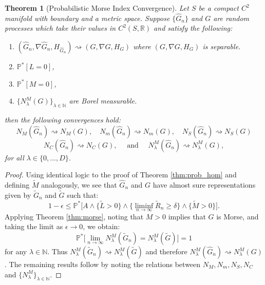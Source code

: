 \documentclass[11pt]{article}
\newcommand{\subscript}[2]{$#1 _ #2$}
\newcommand{\1}{\mathbf{1}}
\newtheorem{thm}{Theorem}%
\theoremstyle{definition}
\theoremstyle{remark}
\begin{document}
\begin{mdframed}
\begin{thm}[Probabilistic Morse Index Convergence]\label{thm:prob_morse}
     Let $S$ be a compact $C^2$ manifold with boundary and a metric space. Suppose $\{\hat{G}_n\}$ and $G$ are random processes which take their values in $C^2(S,\mathbb{R})$ and satisfy the following:
    \begin{enumerate}[label=(\subscript{M}{{\arabic*}})]
        \item $(\hat{G}_n, \nabla \hat{G}_n, H_{\hat{G}_n})\rightsquigarrow (G, \nabla G, H_{G})$ where $(G, \nabla G, H_{G})$ is separable.
        \item $\mathbb{P}^*[L=0]$,
        \item $\mathbb{P}^*[M=0]$,
        \item $\{N_\lambda^M(G)\}_{\lambda \in \mathbb{N}}$ are Borel measurable.
    \end{enumerate}
    then the following convergences hold:
    \begin{equation}\label{eq:conv_res_morse}
        N_M(\hat{G}_n)\rightsquigarrow N_M(G), \quad N_m(\hat{G}_n)\rightsquigarrow N_m(G), \quad N_S(\hat{G}_n)\rightsquigarrow N_S(G) 
        \end{equation}
        \begin{equation}\nonumber
        N_C(\hat{G}_n) \rightsquigarrow N_C(G), \quad \text{ and } \quad N^M_\lambda(\hat{G}_n)\rightsquigarrow N^M_\lambda(G),
    \end{equation}
    for all $\lambda\in \{0,...,D\}$. 
    \vspace{0.2cm}
\end{thm}
\end{mdframed}
\begin{proof}
    Using identical logic to the proof of Theorem \ref{thm:prob_hom} and defining $\tilde{M}$ analogously, we see that $\hat{G}_n$ and $G$ have almost sure representations given by $\tilde{G}_n$ and $\tilde{G}$ such that:
        \begin{equation}\nonumber
        1-\epsilon \leq \mathbb{P}^{*}\bigg[A \land \big\{\tilde{L}>0\big\} \land \big\{\liminf_{n\rightarrow\infty}\tilde{R}_n \geq \delta \big\} \land \{\tilde{M}>0\}\bigg].
    \end{equation}
    Applying Theorem \ref{thm:morse}, noting that $M>0$ implies that $G$ is Morse, and taking the limit as $\epsilon \rightarrow 0$, we obtain:
    \begin{equation}\nonumber
        \mathbb{P}^*\bigg[\lim_{n\rightarrow\infty}N_\lambda^M(\tilde{G}_n)=N_\lambda^M(\tilde{G})\bigg]=1
    \end{equation}
    for any $\lambda \in \mathbb{N}$. Thus $N_\lambda^M(\tilde{G}_n)\rightsquigarrow N_\lambda^M(\tilde{G})$ and therefore $N_\lambda^M(\hat{G}_n)\rightsquigarrow N_\lambda^M(G)$. The remaining results follow by noting the relations between $N_M, N_m, N_S, N_C$ and $\{N_\lambda^M\}_{\lambda \in \mathbb{N}}$.
    
\end{proof}
\end{document}
